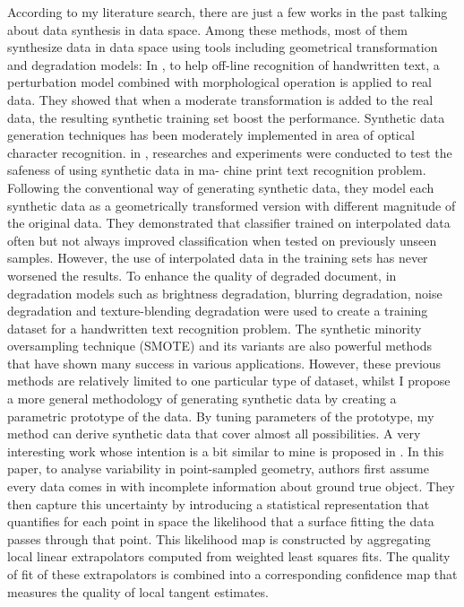 \documentclass{iitthesis}
\begin{document}
According to my literature search, there are just a few works in the past talking about data synthesis in data space. Among these methods, most of them synthesize data in data space using tools including geometrical transformation and degradation models: In \cite{VT:03}, to help off-line recognition of handwritten text, a perturbation model combined with morphological operation is applied to real data. They showed that when a moderate transformation is added to the real data, the resulting synthetic training set boost the performance. Synthetic data generation techniques has been moderately implemented in area of optical character recognition. in \cite{NJ:09}, researches and experiments were conducted to test the safeness of using synthetic data in ma-
chine print text recognition problem. Following the conventional way of generating synthetic data, they model each synthetic data as a geometrically transformed version with different magnitude of the original data. They demonstrated that classifier trained on interpolated data often but not always improved classification when tested on previously unseen samples. However, the use of interpolated data in the training sets has never worsened the results. To enhance the quality of degraded document, in \cite{BG:08} degradation models such as brightness degradation, blurring degradation, noise degradation and texture-blending degradation were used to create a training dataset for a handwritten text recognition problem. The synthetic minority oversampling technique (SMOTE) \cite{CNV:02} and its variants \cite{HH:05}\cite{HH:08} are also powerful methods that have shown many success in various applications.  However, these previous methods are relatively limited to one particular type of dataset, whilst  I propose a more general  methodology of generating synthetic data by creating a parametric prototype of the data. By tuning parameters of the prototype, my method can derive synthetic data that cover almost all possibilities. A very interesting work whose intention is a bit similar to mine is proposed in \cite{Pauly:2004:UVP:2386332.2386346}. In this paper, to analyse variability in point-sampled geometry, authors first assume every data comes in with incomplete information about ground true object. They then capture this uncertainty by introducing a statistical representation that quantifies for each point in space the likelihood that a surface fitting the data passes through that point. This likelihood map is constructed by aggregating local linear extrapolators computed from weighted least squares fits. The quality of fit of these extrapolators is combined into a corresponding confidence map that measures the quality of local tangent estimates.
\end{document}

